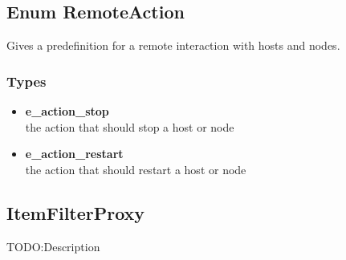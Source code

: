 
\subsection{Enum RemoteAction}
Gives a predefinition for a remote interaction with hosts and nodes.
\subsubsection{Types}
\begin{itemize}
	\item \textbf{e\_action\_stop}\\
	the action that should stop a host or node
	\item \textbf{e\_action\_restart}\\
	the action that should restart a host or node
\end{itemize}

\subsection{ItemFilterProxy}
TODO:Description
